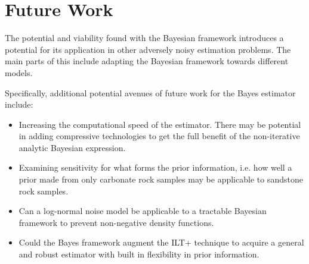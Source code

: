 \section{Future Work}
The potential and viability found with the Bayesian framework introduces a potential for its application in other adversely noisy estimation problems. The main parts of this include adapting the Bayesian framework towards different models.

Specifically, additional potential avenues of future work for the Bayes estimator include:
\begin{itemize}
    \item Increasing the computational speed of the estimator. There may be potential in adding compressive technologies to get the full benefit of the non-iterative analytic Bayesian expression.
    \item Examining sensitivity for what forms the prior information, i.e. how well a prior made from only carbonate rock samples may be applicable to sandstone rock samples. 
    \item Can a log-normal noise model be applicable to a tractable Bayesian framework to prevent non-negative density functions.
    \item Could the Bayes framework augment the ILT+ technique to acquire a general and robust estimator with built in flexibility in prior information.
\end{itemize}


